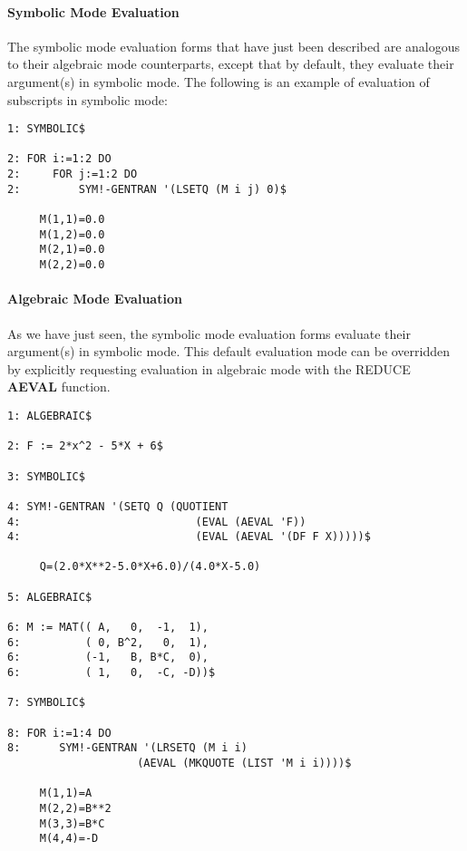 \paragraph{Symbolic Mode Evaluation}
\label{lispeval}
The symbolic mode evaluation forms that have just been described are
analogous to their algebraic mode counterparts, except that
by default, they evaluate their argument(s) in symbolic mode.  The
following is an example of evaluation of subscripts in symbolic mode:
\begin{describe}{\example}
\begin{verbatim}
1: SYMBOLIC$

2: FOR i:=1:2 DO
2:     FOR j:=1:2 DO
2:         SYM!-GENTRAN '(LSETQ (M i j) 0)$

     M(1,1)=0.0
     M(1,2)=0.0
     M(2,1)=0.0
     M(2,2)=0.0
\end{verbatim}
\end{describe}

\paragraph{Algebraic Mode Evaluation}
As we have just seen, the symbolic mode evaluation forms evaluate their
argument(s) in symbolic mode.  This default evaluation mode can be
overridden by explicitly requesting evaluation in algebraic mode with
the REDUCE {\bf AEVAL} function.

\begin{describe}{\example}
\begin{verbatim}
1: ALGEBRAIC$

2: F := 2*x^2 - 5*X + 6$

3: SYMBOLIC$

4: SYM!-GENTRAN '(SETQ Q (QUOTIENT
4:                           (EVAL (AEVAL 'F))
4:                           (EVAL (AEVAL '(DF F X)))))$

     Q=(2.0*X**2-5.0*X+6.0)/(4.0*X-5.0)

5: ALGEBRAIC$

6: M := MAT(( A,   0,  -1,  1),
6:          ( 0, B^2,   0,  1),
6:          (-1,   B, B*C,  0),
6:          ( 1,   0,  -C, -D))$

7: SYMBOLIC$

8: FOR i:=1:4 DO
8:      SYM!-GENTRAN '(LRSETQ (M i i)
                    (AEVAL (MKQUOTE (LIST 'M i i))))$

     M(1,1)=A
     M(2,2)=B**2
     M(3,3)=B*C
     M(4,4)=-D
\end{verbatim}
\end{describe}

